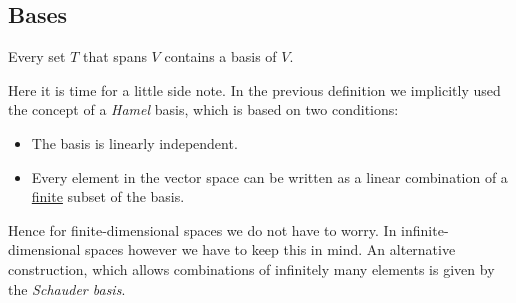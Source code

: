\subsection{Bases}
	
	\begin{result}
		Every set $T$ that spans $V$ contains a basis of $V$.
	\end{result}
	
	\begin{remark}
		Here it is time for a little side note. In the previous definition we implicitly used the concept of a \textit{Hamel} basis, which is based on two conditions:
		\begin{itemize}
			\item The basis is linearly independent.
			\item Every element in the vector space can be written as a linear combination of a \underline{finite} subset of the basis.
		\end{itemize}
		Hence for finite-dimensional spaces we do not have to worry. In infinite-dimensional spaces however we have to keep this in mind. An alternative construction, which allows combinations of infinitely many elements is given by the \textit{Schauder basis}.
	\end{remark}
	
